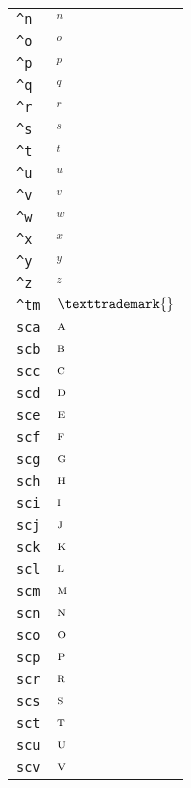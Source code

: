 \begin{longtable}{ll}
\texttt{\textasciicircum n}&${}^n{}$\\
\texttt{\textasciicircum o}&${}^o{}$\\
\texttt{\textasciicircum p}&${}^p{}$\\
\texttt{\textasciicircum q}&${}^q{}$\\
\texttt{\textasciicircum r}&${}^r{}$\\
\texttt{\textasciicircum s}&${}^s{}$\\
\texttt{\textasciicircum t}&${}^t{}$\\
\texttt{\textasciicircum u}&${}^u{}$\\
\texttt{\textasciicircum v}&${}^v{}$\\
\texttt{\textasciicircum w}&${}^w{}$\\
\texttt{\textasciicircum x}&${}^x{}$\\
\texttt{\textasciicircum y}&${}^y{}$\\
\texttt{\textasciicircum z}&${}^z{}$\\
\texttt{\textasciicircum tm}&${}\texttrademark{}$\\
\texttt{sca}&${}{\textsc{a}}{}$\\
\texttt{scb}&${}{\textsc{b}}{}$\\
\texttt{scc}&${}{\textsc{c}}{}$\\
\texttt{scd}&${}{\textsc{d}}{}$\\
\texttt{sce}&${}{\textsc{e}}{}$\\
\texttt{scf}&${}{\textsc{f}}{}$\\
\texttt{scg}&${}{\textsc{g}}{}$\\
\texttt{sch}&${}{\textsc{h}}{}$\\
\texttt{sci}&${}{\textsc{i}}{}$\\
\texttt{scj}&${}{\textsc{j}}{}$\\
\texttt{sck}&${}{\textsc{k}}{}$\\
\texttt{scl}&${}{\textsc{l}}{}$\\
\texttt{scm}&${}{\textsc{m}}{}$\\
\texttt{scn}&${}{\textsc{n}}{}$\\
\texttt{sco}&${}{\textsc{o}}{}$\\
\texttt{scp}&${}{\textsc{p}}{}$\\
\texttt{scr}&${}{\textsc{r}}{}$\\
\texttt{scs}&${}{\textsc{s}}{}$\\
\texttt{sct}&${}{\textsc{t}}{}$\\
\texttt{scu}&${}{\textsc{u}}{}$\\
\texttt{scv}&${}{\textsc{v}}{}$\\

\end{longtable}
